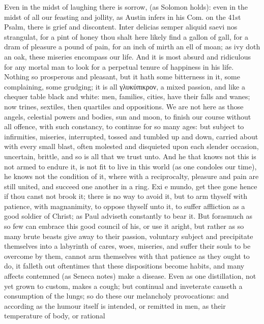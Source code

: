 {Even in the midst of laughing there is sorrow, (as Solomon holds):
even in the midst of all our feasting and jollity, as Austin
infers in his Com. on the 41st Psalm, there is grief and discontent.
Inter delicias semper aliquid saevi nos strangulat, for a pint of honey
thou shalt here likely find a gallon of gall, for a dram of pleasure a
pound of pain, for an inch of mirth an ell of moan; as ivy doth an oak,
these miseries encompass our life. And it is most absurd and ridiculous
for any mortal man to look for a perpetual tenure of happiness in his
life. Nothing so prosperous and pleasant, but it hath some
bitterness in it, some complaining, some grudging; it is all
γλυκύπικρον, a mixed passion, and like a chequer table black and white:
men, families, cities, have their falls and wanes; now trines,
sextiles, then quartiles and oppositions. We are not here as those
angels, celestial powers and bodies, sun and moon, to finish our course
without all offence, with such constancy, to continue for so many ages:
but subject to infirmities, miseries, interrupted, tossed and tumbled
up and down, carried about with every small blast, often molested and
disquieted upon each slender occasion, uncertain, brittle, and so
is all that we trust unto.  And he that knows not this is not
armed to endure it, is not fit to live in this world (as one condoles
our time), he knows not the condition of it, where with a reciprocalty,
pleasure and pain are still united, and succeed one another in a ring.
Exi e mundo, get thee gone hence if thou canst not brook it; there is
no way to avoid it, but to arm thyself with patience, with magnanimity,
to oppose thyself unto it, to suffer affliction as a good soldier
of Christ; as Paul adviseth constantly to bear it. But forasmuch
as so few can embrace this good council of his, or use it aright, but
rather as so many brute beasts give away to their passion, voluntary
subject and precipitate themselves into a labyrinth of cares, woes,
miseries, and suffer their souls to be overcome by them, cannot arm
themselves with that patience as they ought to do, it falleth out
oftentimes that these dispositions become habits, and many affects
contemned (as Seneca notes) make a disease. Even as one
distillation, not yet grown to custom, makes a cough; but continual and
inveterate causeth a consumption of the lungs; so do these our
melancholy provocations: and according as the humour itself is
intended, or remitted in men, as their temperature of body, or rational
}
